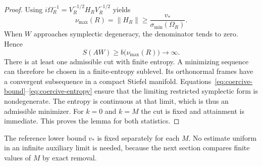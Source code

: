 \documentclass[11pt,a4paper]{article}
\numberwithin{equation}{section}
\theoremstyle{remark}
\newcommand{\norm}[1]{\lVert#1\rVert}
\begin{document}
\begin{proof}
Using $i\Omega_R^{-1}=V_R^{-1/2}H_RV_R^{-1/2}$ yields
\begin{equation}\label{eq:coercive-bound}
 \nu_{\max}(R)=\norm{H_R}
 \ge \frac{v_*}{\sigma_{\min}(\Omega_R)}.
\end{equation}
When $W$ approaches symplectic degeneracy, the denominator tends to zero. Hence
\begin{equation}\label{eq:coercive-entropy}
 S(AW)\ge b\bigl(\nu_{\max}(R)\bigr)\longrightarrow\infty.
\end{equation}
There is at least one admissible cut with finite entropy. A minimizing sequence can therefore be chosen in a finite-entropy sublevel. Its orthonormal frames have a convergent subsequence in a compact Stiefel manifold. Equations~\eqref{eq:coercive-bound}--\eqref{eq:coercive-entropy} ensure that the limiting restricted symplectic form is nondegenerate. The entropy is continuous at that limit, which is thus an admissible minimizer. For $k=0$ and $k=M$ the cut is fixed and attainment is immediate. This proves the lemma for both statistics.
\end{proof}

The reference lower bound $v_*$ is fixed separately for each $M$. No estimate uniform in an infinite auxiliary limit is needed, because the next section compares finite values of $M$ by exact removal.
\end{document}

